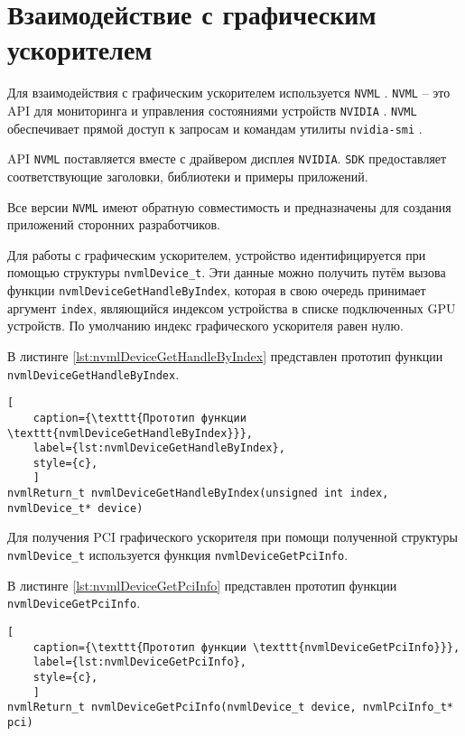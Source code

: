 \newpage
\section{Взаимодействие с графическим ускорителем}

Для взаимодействия с графическим ускорителем используется \texttt{NVML} \cite{nvml}. \texttt{NVML} -- это API для мониторинга и управления состояниями устройств \texttt{NVIDIA} \cite{nvidia}. \texttt{NVML} обеспечивает прямой доступ к запросам и командам утилиты \texttt{nvidia-smi} \cite{nvidia_smi}. 

API \texttt{NVML} поставляется вместе с драйвером дисплея \texttt{NVIDIA}. \texttt{SDK} предоставляет соответствующие заголовки, библиотеки и примеры приложений. 

Все версии \texttt{NVML} имеют обратную совместимость и предназначены для создания приложений сторонних разработчиков.

Для работы с графическим ускорителем, устройство идентифицируется при помощью структуры \texttt{nvmlDevice\_t}. Эти данные можно получить путём вызова функции \texttt{nvmlDeviceGetHandleByIndex}, которая в свою очередь принимает аргумент \texttt{index}, являющийся индексом устройства в списке подключенных GPU устройств. По умолчанию индекс графического ускорителя равен нулю. 

В листинге \ref{lst:nvmlDeviceGetHandleByIndex} представлен прототип функции\\ \texttt{nvmlDeviceGetHandleByIndex}. 

\begin{lstlisting}[
	caption={\texttt{Прототип функции \texttt{nvmlDeviceGetHandleByIndex}}},
	label={lst:nvmlDeviceGetHandleByIndex},
	style={c},
	]
nvmlReturn_t nvmlDeviceGetHandleByIndex(unsigned int index, nvmlDevice_t* device)
\end{lstlisting}

Для получения PCI графического ускорителя при помощи полученной структуры \texttt{nvmlDevice\_t} используется функция \texttt{nvmlDeviceGetPciInfo}.

В листинге \ref{lst:nvmlDeviceGetPciInfo} представлен прототип функции \texttt{nvmlDeviceGetPciInfo}. 

\begin{lstlisting}[
	caption={\texttt{Прототип функции \texttt{nvmlDeviceGetPciInfo}}},
	label={lst:nvmlDeviceGetPciInfo},
	style={c},
	]
nvmlReturn_t nvmlDeviceGetPciInfo(nvmlDevice_t device, nvmlPciInfo_t* pci)
\end{lstlisting}

